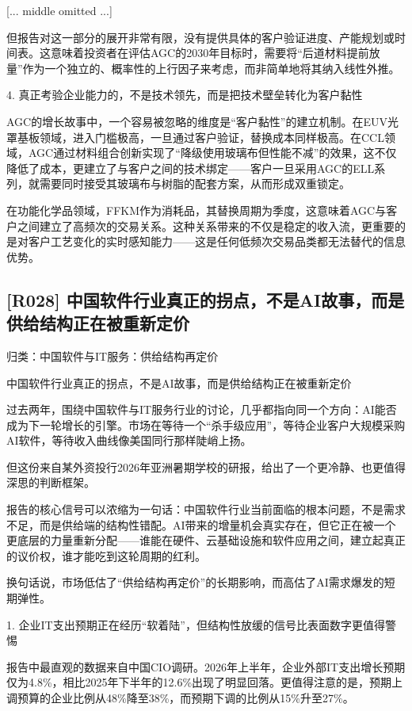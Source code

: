 \documentclass[11pt]{ctexart}
\begin{document}
[... middle omitted ...]


但报告对这一部分的展开非常有限，没有提供具体的客户验证进度、产能规划或时间表。这意味着投资者在评估AGC的2030年目标时，需要将“后道材料提前放量”作为一个独立的、概率性的上行因子来考虑，而非简单地将其纳入线性外推。

4. 真正考验企业能力的，不是技术领先，而是把技术壁垒转化为客户黏性

AGC的增长故事中，一个容易被忽略的维度是“客户黏性”的建立机制。在EUV光罩基板领域，进入门槛极高，一旦通过客户验证，替换成本同样极高。在CCL领域，AGC通过材料组合创新实现了“降级使用玻璃布但性能不减”的效果，这不仅降低了成本，更建立了与客户之间的技术绑定——客户一旦采用AGC的ELL系列，就需要同时接受其玻璃布与树脂的配套方案，从而形成双重锁定。

在功能化学品领域，FFKM作为消耗品，其替换周期为季度，这意味着AGC与客户之间建立了高频次的交易关系。这种关系带来的不仅是稳定的收入流，更重要的是对客户工艺变化的实时感知能力——这是任何低频次交易品类都无法替代的信息优势。

\subsection{[R028] 中国软件行业真正的拐点，不是AI故事，而是供给结构正在被重新定价}
{\small\color{refgray}归类：中国软件与IT服务：供给结构再定价}

中国软件行业真正的拐点，不是AI故事，而是供给结构正在被重新定价

过去两年，围绕中国软件与IT服务行业的讨论，几乎都指向同一个方向：AI能否成为下一轮增长的引擎。市场在等待一个“杀手级应用”，等待企业客户大规模采购AI软件，等待收入曲线像美国同行那样陡峭上扬。

但这份来自某外资投行2026年亚洲暑期学校的研报，给出了一个更冷静、也更值得深思的判断框架。

报告的核心信号可以浓缩为一句话：中国软件行业当前面临的根本问题，不是需求不足，而是供给端的结构性错配。AI带来的增量机会真实存在，但它正在被一个更底层的力量重新分配——谁能在硬件、云基础设施和软件应用之间，建立起真正的议价权，谁才能吃到这轮周期的红利。

换句话说，市场低估了“供给结构再定价”的长期影响，而高估了AI需求爆发的短期弹性。

1. 企业IT支出预期正在经历“软着陆”，但结构性放缓的信号比表面数字更值得警惕

报告中最直观的数据来自中国CIO调研。2026年上半年，企业外部IT支出增长预期仅为4.8\%，相比2025年下半年的12.6\%出现了明显回落。更值得注意的是，预期上调预算的企业比例从48\%降至38\%，而预期下调的比例从15\%升至27\%。
\end{document}

